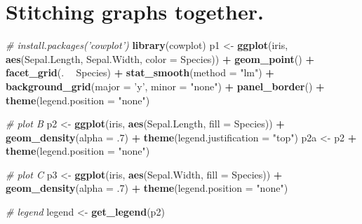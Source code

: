 \documentclass[12pt,letterpaperpaper,openany]{book}
\newenvironment{Shaded}{\begin{snugshade}}{\end{snugshade}}
\newcommand{\CommentTok}[1]{\textcolor[rgb]{0.56,0.35,0.01}{\textit{#1}}}
\newcommand{\DataTypeTok}[1]{\textcolor[rgb]{0.13,0.29,0.53}{#1}}
\newcommand{\FloatTok}[1]{\textcolor[rgb]{0.00,0.00,0.81}{#1}}
\newcommand{\KeywordTok}[1]{\textcolor[rgb]{0.13,0.29,0.53}{\textbf{#1}}}
\newcommand{\NormalTok}[1]{#1}
\newcommand{\OperatorTok}[1]{\textcolor[rgb]{0.81,0.36,0.00}{\textbf{#1}}}
\newcommand{\StringTok}[1]{\textcolor[rgb]{0.31,0.60,0.02}{#1}}
\begin{document}
\hypertarget{stitching-graphs-together.}{%
\section{Stitching graphs together.}\label{stitching-graphs-together.}}

\begin{Shaded}
\begin{Highlighting}[]
\CommentTok{# install.packages('cowplot')}
\KeywordTok{library}\NormalTok{(cowplot)}
\NormalTok{p1 <-}\StringTok{ }\KeywordTok{ggplot}\NormalTok{(iris, }\KeywordTok{aes}\NormalTok{(Sepal.Length, Sepal.Width, }\DataTypeTok{color =}\NormalTok{ Species)) }\OperatorTok{+}
\StringTok{ }\KeywordTok{geom_point}\NormalTok{() }\OperatorTok{+}\StringTok{ }\KeywordTok{facet_grid}\NormalTok{(. }\OperatorTok{~}\StringTok{ }\NormalTok{Species) }\OperatorTok{+}\StringTok{ }\KeywordTok{stat_smooth}\NormalTok{(}\DataTypeTok{method =} \StringTok{"lm"}\NormalTok{) }\OperatorTok{+}
\StringTok{ }\KeywordTok{background_grid}\NormalTok{(}\DataTypeTok{major =} \StringTok{'y'}\NormalTok{, }\DataTypeTok{minor =} \StringTok{"none"}\NormalTok{) }\OperatorTok{+}
\StringTok{ }\KeywordTok{panel_border}\NormalTok{() }\OperatorTok{+}\StringTok{ }\KeywordTok{theme}\NormalTok{(}\DataTypeTok{legend.position =} \StringTok{"none"}\NormalTok{)}

\CommentTok{# plot B}
\NormalTok{p2 <-}\StringTok{ }\KeywordTok{ggplot}\NormalTok{(iris, }\KeywordTok{aes}\NormalTok{(Sepal.Length, }\DataTypeTok{fill =}\NormalTok{ Species)) }\OperatorTok{+}
\StringTok{ }\KeywordTok{geom_density}\NormalTok{(}\DataTypeTok{alpha =} \FloatTok{.7}\NormalTok{) }\OperatorTok{+}\StringTok{ }\KeywordTok{theme}\NormalTok{(}\DataTypeTok{legend.justification =} \StringTok{"top"}\NormalTok{)}
\NormalTok{p2a <-}\StringTok{ }\NormalTok{p2 }\OperatorTok{+}\StringTok{ }\KeywordTok{theme}\NormalTok{(}\DataTypeTok{legend.position =} \StringTok{"none"}\NormalTok{)}

\CommentTok{# plot C}
\NormalTok{p3 <-}\StringTok{ }\KeywordTok{ggplot}\NormalTok{(iris, }\KeywordTok{aes}\NormalTok{(Sepal.Width, }\DataTypeTok{fill =}\NormalTok{ Species)) }\OperatorTok{+}
\StringTok{ }\KeywordTok{geom_density}\NormalTok{(}\DataTypeTok{alpha =} \FloatTok{.7}\NormalTok{) }\OperatorTok{+}\StringTok{ }\KeywordTok{theme}\NormalTok{(}\DataTypeTok{legend.position =} \StringTok{"none"}\NormalTok{)}

\CommentTok{# legend}
\NormalTok{legend <-}\StringTok{ }\KeywordTok{get_legend}\NormalTok{(p2)}


\end{Highlighting}
\end{Shaded}
\end{document}

